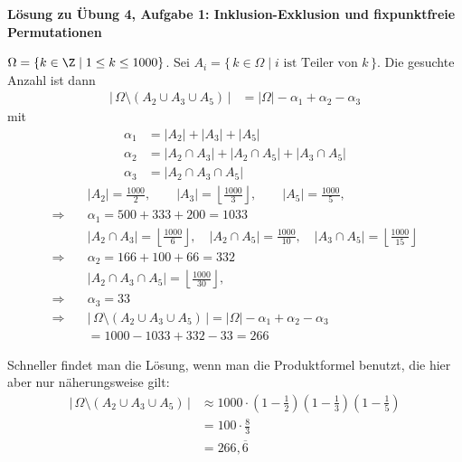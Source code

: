 \textbf{Lösung zu Übung 4, Aufgabe 1: Inklusion-Exklusion und fixpunktfreie Permutationen}

\begin{loesung}
$\Omega = \{k \in \Z \mid 1 \le k \le 1000\}$. Sei $A_i = \{\, k \in \Omega \mid i \text{ ist Teiler von } k \,\}$.
Die gesuchte Anzahl ist dann
\begin{align*}
|\,\Omega \setminus (A_2 \cup A_3 \cup A_5)\,| &= |\Omega| - \alpha_1 + \alpha_2 - \alpha_3
\end{align*}
mit
\begin{align*}
\alpha_1 &= |A_2| + |A_3| + |A_5|\\
\alpha_2 &= |A_2 \cap A_3| + |A_2 \cap A_5| + |A_3 \cap A_5|\\
\alpha_3 &= |A_2 \cap A_3 \cap A_5|
\end{align*}
\begin{align*}
&|A_2| = \frac{1000}{2}, \qquad |A_3| = \left\lfloor \frac{1000}{3} \right\rfloor, \qquad |A_5| = \frac{1000}{5},\\
\Rightarrow\quad &\alpha_1 = 500 + 333 + 200 = 1033\\
&|A_2 \cap A_3| = \left\lfloor \frac{1000}{6} \right\rfloor, \quad |A_2 \cap A_5| = \frac{1000}{10}, \quad |A_3 \cap A_5| = \left\lfloor \frac{1000}{15} \right\rfloor\\
\Rightarrow\quad &\alpha_2 = 166 + 100 + 66 = 332\\
&|A_2 \cap A_3 \cap A_5| = \left\lfloor \frac{1000}{30} \right\rfloor,\\
\Rightarrow\quad &\alpha_3 = 33\\
\Rightarrow\quad &|\,\Omega \setminus (A_2 \cup A_3 \cup A_5)\,| = |\Omega| - \alpha_1 + \alpha_2 - \alpha_3\\
&= 1000 - 1033 + 332 - 33 = 266
\end{align*}

Schneller findet man die Lösung, wenn man die Produktformel benutzt, die hier aber nur näherungsweise gilt:
\begin{align*}
|\,\Omega \setminus (A_2 \cup A_3 \cup A_5)\,| &\approx 1000 \cdot \left(1 - \frac{1}{2}\right)\left(1 - \frac{1}{3}\right)\left(1 - \frac{1}{5}\right)\\
&= 100 \cdot \frac{8}{3}\\
&= 266{,}\overline{6}
\end{align*}
\end{loesung}
